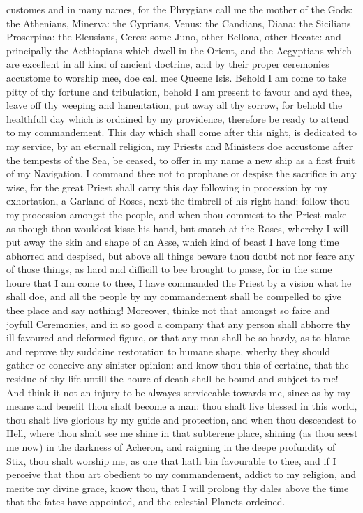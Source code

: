 customes and in many names, for the Phrygians call me the mother of the Gods:
the Athenians, Minerva: the Cyprians, Venus: the Candians, Diana: the Sicilians
Proserpina: the Eleusians, Ceres: some Juno, other Bellona, other Hecate: and
principally the Aethiopians which dwell in the Orient, and the Aegyptians which
are excellent in all kind of ancient doctrine, and by their proper ceremonies
accustome to worship mee, doe call mee Queene Isis. Behold I am come to take
pitty of thy fortune and tribulation, behold I am present to favour and ayd
thee, leave off thy weeping and lamentation, put away all thy sorrow, for
behold the healthfull day which is ordained by my providence, therefore be
ready to attend to my commandement. This day which shall come after this night,
is dedicated to my service, by an eternall religion, my Priests and Ministers
doe accustome after the tempests of the Sea, be ceased, to offer in my name a
new ship as a first fruit of my Navigation. I command thee not to prophane or
despise the sacrifice in any wise, for the great Priest shall carry this day
following in procession by my exhortation, a Garland of Roses, next the
timbrell of his right hand: follow thou my procession amongst the people, and
when thou commest to the Priest make as though thou wouldest kisse his hand,
but snatch at the Roses, whereby I will put away the skin and shape of an Asse,
which kind of beast I have long time abhorred and despised, but above all
things beware thou doubt not nor feare any of those things, as hard and
difficill to bee brought to passe, for in the same houre that I am come to
thee, I have commanded the Priest by a vision what he shall doe, and all the
people by my commandement shall be compelled to give thee place and say
nothing! Moreover, thinke not that amongst so faire and joyfull Ceremonies, and
in so good a company that any person shall abhorre thy ill-favoured and
deformed figure, or that any man shall be so hardy, as to blame and reprove thy
suddaine restoration to humane shape, wherby they should gather or conceive any
sinister opinion: and know thou this of certaine, that the residue of thy life
untill the houre of death shall be bound and subject to me! And think it not an
injury to be alwayes serviceable towards me, since as by my meane and benefit
thou shalt become a man: thou shalt live blessed in this world, thou shalt live
glorious by my guide and protection, and when thou descendest to Hell, where
thou shalt see me shine in that subterene place, shining (as thou seest me now)
in the darkness of Acheron, and raigning in the deepe profundity of Stix, thou
shalt worship me, as one that hath bin favourable to thee, and if I perceive
that thou art obedient to my commandement, addict to my religion, and merite my
divine grace, know thou, that I will prolong thy dales above the time that the
fates have appointed, and the celestial Planets ordeined.

